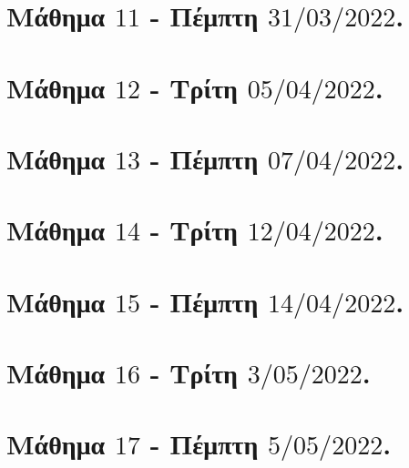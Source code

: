 \documentclass[oneside,a4paper]{article}
\begin{document}
\pagebreak

\section*{Μάθημα $11$ - Πέμπτη $31/03/2022$.}
\vspace{0.3truecm}


\pagebreak


\section*{Μάθημα $12$ - Τρίτη $05/04/2022$.}
\vspace{0.3truecm}


\pagebreak

\section*{Μάθημα $13$ - Πέμπτη $07/04/2022$.}
\vspace{0.3truecm}


\pagebreak



\section*{Μάθημα $14$ - Τρίτη $12/04/2022$.}
\vspace{0.3truecm}


\pagebreak

\section*{Μάθημα $15$ - Πέμπτη $14/04/2022$.}
\vspace{0.3truecm}


\pagebreak

\section*{Μάθημα $16$ - Τρίτη $3/05/2022$.}
\vspace{0.3truecm}


\pagebreak

\section*{Μάθημα $17$ - Πέμπτη $5/05/2022$.}
\vspace{0.3truecm}

\end{document}
